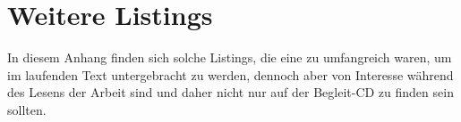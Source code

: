
\chapter{Weitere Listings} %
\label{cha:more_listing}

  In diesem Anhang finden sich solche Listings, die eine zu umfangreich waren, um im laufenden Text untergebracht zu werden, dennoch aber von Interesse während des Lesens der Arbeit sind und daher nicht nur auf der Begleit-CD zu finden sein sollten.

  

  
  
  
    
